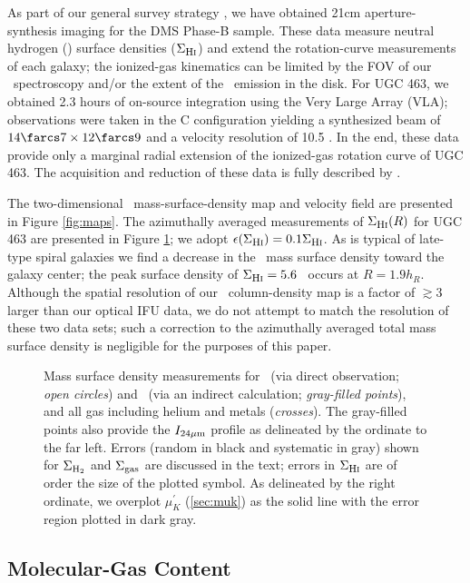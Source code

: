 \documentclass[apj,iop,numberedappendix]{emulateapj}
\begin{document}
As part of our general survey strategy , we have
obtained 21cm aperture-synthesis imaging for the DMS Phase-B sample.  These
data measure neutral hydrogen (\hone) surface densities ($\Sigma_{\mbox{\rm \footnotesize H{\scshape i}}}$) and extend the
rotation-curve measurements of each galaxy; the ionized-gas kinematics can be
limited by the FOV of our \halp\ spectroscopy and/or the extent of the \halp\
emission in the disk.  For UGC 463, we obtained 2.3 hours of on-source
integration using the Very Large Array (VLA); observations were taken in the C
configuration yielding a synthesized beam of $14\farcs7\times12\farcs9$ and a
velocity resolution of 10.5 \kms.  In the end, these data provide only a
marginal radial extension of the ionized-gas rotation curve of UGC 463.  The
acquisition and reduction of these data is fully described by \citet{TPKMPhD}.

The two-dimensional \hone\ mass-surface-density map and velocity field are
presented in Figure \ref{fig:maps}.  The azimuthally averaged measurements of
$\Sigma_{\mbox{\rm \footnotesize H{\scshape i}}}(R)$ for UGC 463 are presented in Figure \ref{fig:sdgas}; we adopt
$\epsilon(\Sigma_{\mbox{\rm \footnotesize H{\scshape i}}}) = 0.1\Sigma_{\mbox{\rm \footnotesize H{\scshape i}}}$.  As is typical of late-type spiral galaxies we
find a decrease in the \hone\ mass surface density toward the galaxy center; the
peak surface density of $\Sigma_{\mbox{\rm \footnotesize H{\scshape i}}}= 5.6$ \sdu\ occurs at $R=1.9 h_R$.  Although the
spatial resolution of our \hone\ column-density map is a factor of $\gtrsim3$
larger than our optical IFU data, we do not attempt to match the resolution of
these two data sets; such a correction to the azimuthally averaged total mass
surface density is negligible for the purposes of this paper.

\begin{figure}
\caption{
%
Mass surface density measurements for \hone\ (via direct observation; {\it open
circles}) and \molh\ (via an indirect calculation; {\it gray-filled points}),
and all gas including helium and metals ({\it crosses}).  The gray-filled points
also provide the $I_{24\mu{\rm m}}$ profile as delineated by the ordinate to the far left.
Errors (random in black and systematic in gray) shown for $\Sigma_{\rm H_2}$ and $\Sigma_{\rm gas}$ are
discussed in the text; errors in $\Sigma_{\mbox{\rm \footnotesize H{\scshape i}}}$ are of order the size of the plotted
symbol.  As delineated by the right ordinate, we overplot $\mu^{\prime}_K$
(\sect \ref{sec:muk}) as the solid line with the error region plotted in dark
gray.
%
}
\label{fig:sdgas}
\end{figure}

\subsection{Molecular-Gas Content}
\label{sec:hmol}
\end{document}
